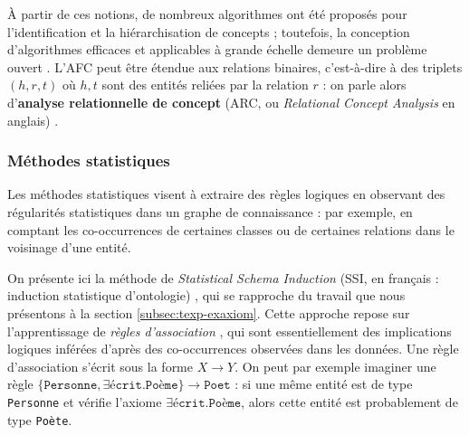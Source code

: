 À partir de ces notions, de nombreux algorithmes ont été proposés pour l'identification et la hiérarchisation de concepts \cite{valtchev2001building, nourine1999fast, farach2008linear}; 
toutefois, la conception d'algorithmes efficaces et applicables à grande échelle demeure un problème ouvert %
\cite{li2016approximate, zhang2019new}.
L'AFC peut être étendue aux relations binaires, c'est-à-dire à des triplets $(h, r, t)$ où $h, t$ sont des entités reliées par la relation $r$ : on parle alors d'\textbf{analyse relationnelle de concept} (ARC, ou \textit{Relational Concept Analysis} en anglais) \cite{bendaoud2008rcafca}. %

\subsubsection{Méthodes statistiques}

Les méthodes statistiques visent à extraire des règles logiques en observant des régularités statistiques dans un graphe de connaissance : par exemple, en comptant les co-occurrences de certaines classes ou de certaines relations dans le voisinage d'une entité. 

On présente ici la méthode de \textit{Statistical Schema Induction} (SSI, en français : induction statistique d'ontologie) \cite{volker2011statistical}, qui se rapproche du travail que nous présentons à la section \ref{subsec:texp-exaxiom}. Cette approche repose sur l'apprentissage de \textit{règles d'association} \cite{zhang2003association}, qui sont essentiellement des implications logiques inférées d'après des co-occurrences observées dans les données. 
Une règle d'association s'écrit sous la forme $X \rightarrow Y$. On peut par exemple imaginer une règle $\{\texttt{Personne}, \exists \texttt{écrit}.\texttt{Poème} \} \rightarrow \texttt{Poet}$ : si une même entité est de type \texttt{Personne} et vérifie l'axiome $\exists \texttt{écrit}.\texttt{Poème}$, alors cette entité est probablement de type \texttt{Poète}.

